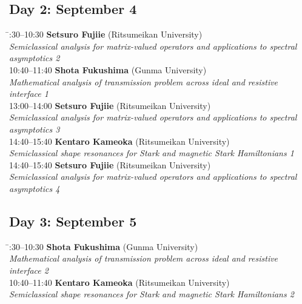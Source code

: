 \documentclass[a4paper,11pt]{article}
\numberwithin{equation}{section}
\begin{document}
\subsection*{Day 2: September 4}
\begin{tabbing}
  \hspace{3cm}\=:30--10:30 \> \textbf{Setsuro Fujiie}  (Ritsumeikan University)\\
                \> \emph{Semiclassical analysis for matrix-valued operators
and applications to spectral}\\
               \> \emph{ asymptotics 2}\\

  10:40--11:40 \> \textbf{Shota Fukushima}  (Gunma University)\\
                \> \emph{Mathematical analysis of transmission problem across ideal and resistive}\\
               \> \emph{ interface 1}\\

  13:00--14:00 \> \textbf{Setsuro Fujiie}  (Ritsumeikan University)\\
                \> \emph{Semiclassical analysis for matrix-valued operators
and applications to spectral}\\
               \> \emph{ asymptotics 3}\\

  14:40--15:40 \> \textbf{Kentaro Kameoka}  (Ritsumeikan University)\\
                \> \emph{Semiclassical shape resonances for Stark and magnetic Stark Hamiltonians 1}\\
                
  14:40--15:40 \> \textbf{Setsuro Fujiie}  (Ritsumeikan University)\\
                \> \emph{Semiclassical analysis for matrix-valued operators
and applications to spectral}\\
               \> \emph{ asymptotics 4}
\end{tabbing}

\subsection*{Day 3: September 5}
\begin{tabbing}
  \hspace{3cm}\=:30--10:30 \> \textbf{Shota Fukushima}  (Gunma University)\\
                \> \emph{Mathematical analysis of transmission problem across ideal and resistive}\\
               \> \emph{ interface 2}\\

  10:40--11:40 \> \textbf{Kentaro Kameoka}  (Ritsumeikan University)\\
                \> \emph{Semiclassical shape resonances for Stark and magnetic Stark Hamiltonians 2}
\end{tabbing}
\end{document}
